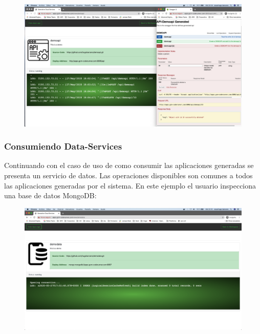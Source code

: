 \documentclass[a4paper,11pt]{book}
\begin{document}
\begin{figure}[H]
\centering
\includegraphics[scale=0.2]{imagenes/casouso/1_11.png}
\caption{   }
\end{figure}
\subsubsection{Consumiendo Data-Services}

Continuando con el caso de uso de como consumir las aplicaciones generadas se presenta un servicio de datos. Las operaciones disponibles son comunes a todos las aplicaciones generadas por el sistema. En este ejemplo el usuario inspecciona una base de datos MongoDB: 

\begin{figure}[H]
\centering
\includegraphics[scale=0.2]{imagenes/casouso/1_13.png}
\caption{   }
\end{figure}
\end{document}
